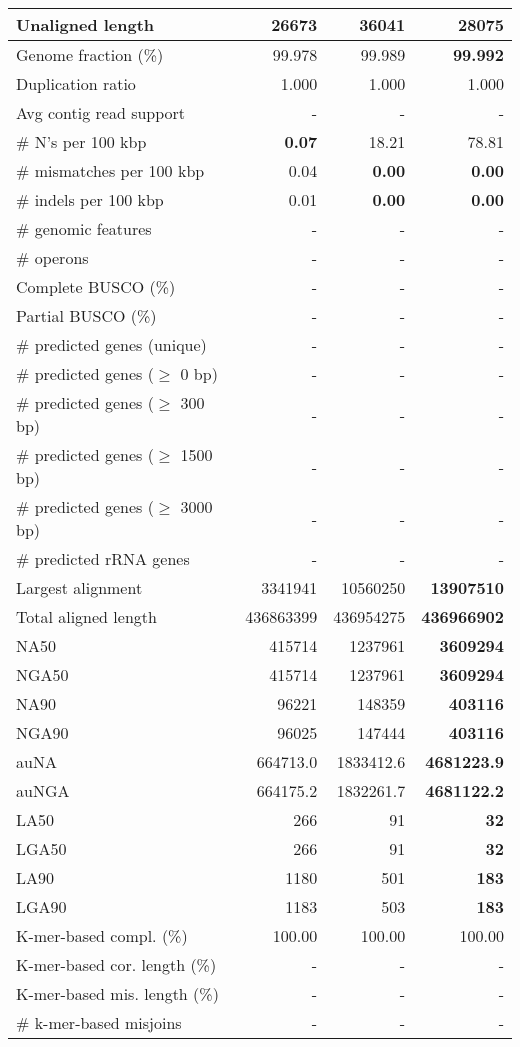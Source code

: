 \documentclass[12pt,a4paper]{article}
\begin{document}
\begin{table}[ht]
\begin{center}
\begin{tabular}{|l*{3}{|r}|}
Unaligned length & {\bf 26673} & 36041 & 28075 \\ \hline
Genome fraction (\%) & 99.978 & 99.989 & {\bf 99.992} \\ \hline
Duplication ratio & 1.000 & 1.000 & 1.000 \\ \hline
Avg contig read support & - & - & - \\ \hline
\# N's per 100 kbp & {\bf 0.07} & 18.21 & 78.81 \\ \hline
\# mismatches per 100 kbp & 0.04 & {\bf 0.00} & {\bf 0.00} \\ \hline
\# indels per 100 kbp & 0.01 & {\bf 0.00} & {\bf 0.00} \\ \hline
\# genomic features & - & - & - \\ \hline
\# operons & - & - & - \\ \hline
Complete BUSCO (\%) & - & - & - \\ \hline
Partial BUSCO (\%) & - & - & - \\ \hline
\# predicted genes (unique) & - & - & - \\ \hline
\# predicted genes ($\geq$ 0 bp) & - & - & - \\ \hline
\# predicted genes ($\geq$ 300 bp) & - & - & - \\ \hline
\# predicted genes ($\geq$ 1500 bp) & - & - & - \\ \hline
\# predicted genes ($\geq$ 3000 bp) & - & - & - \\ \hline
\# predicted rRNA genes & - & - & - \\ \hline
Largest alignment & 3341941 & 10560250 & {\bf 13907510} \\ \hline
Total aligned length & 436863399 & 436954275 & {\bf 436966902} \\ \hline
NA50 & 415714 & 1237961 & {\bf 3609294} \\ \hline
NGA50 & 415714 & 1237961 & {\bf 3609294} \\ \hline
NA90 & 96221 & 148359 & {\bf 403116} \\ \hline
NGA90 & 96025 & 147444 & {\bf 403116} \\ \hline
auNA & 664713.0 & 1833412.6 & {\bf 4681223.9} \\ \hline
auNGA & 664175.2 & 1832261.7 & {\bf 4681122.2} \\ \hline
LA50 & 266 & 91 & {\bf 32} \\ \hline
LGA50 & 266 & 91 & {\bf 32} \\ \hline
LA90 & 1180 & 501 & {\bf 183} \\ \hline
LGA90 & 1183 & 503 & {\bf 183} \\ \hline
K-mer-based compl. (\%) & 100.00 & 100.00 & 100.00 \\ \hline
K-mer-based cor. length (\%) & - & - & - \\ \hline
K-mer-based mis. length (\%) & - & - & - \\ \hline
\# k-mer-based misjoins & - & - & - \\ \hline
\end{tabular}
\end{center}
\end{table}
\end{document}
